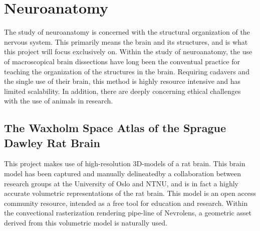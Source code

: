 \section{Neuroanatomy}

The study of neuroanatomy is concerned with the structural organization of the nervous system. This primarily means the brain and its structures, and is what this project will focus exclusively on.
Within the study of neuroanatomy, the use of macroscopical brain dissections have long been the conventual practice for teaching the organization of the structures in the brain. Requiring cadavers and the single use of their brain, this method is highly resource intensive and has limited scalability. In addition, there are deeply concerning ethical challenges with the use of animals in research. 


\subsection*{The Waxholm Space Atlas of the Sprague Dawley Rat Brain}\label{chap:ratbrain}




This project makes use of high-resolution 3D-models of a rat brain. This brain model has been captured and manually delineated\footnotemark[1] by a collaboration between research groups at the University of Oslo and NTNU, and is in fact a highly accurate volumetric representations of the rat brain. This model is an open access community resource, intended as a free tool for education and research\footnotemark[2]. Within the convectional rasterization rendering pipe-line of Nevrolens, a geometric asset derived from this volumetric model is naturally used. 

